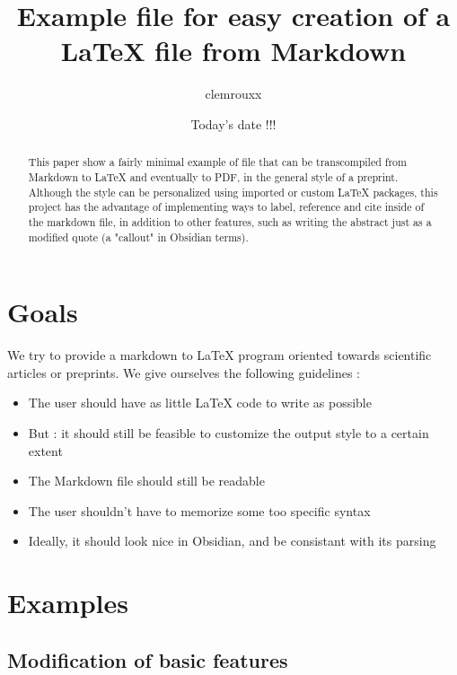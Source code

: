 \documentclass{article}
\title{Example file for easy creation of a LaTeX file from Markdown}
\author[1]{clemrouxx }
\affil[1]{ETH Zürich}
\date{Today's date !!!}
\begin{document}
\maketitle
\begin{abstract}

This paper show a fairly minimal example of file that can be transcompiled from Markdown to LaTeX and eventually to PDF, in the general style of a preprint. Although the style can be personalized using imported or custom LaTeX packages, this project has the advantage of implementing ways to label, reference and cite inside of the markdown file, in addition to other features, such as writing the abstract just as a modified quote (a "callout" in Obsidian terms).
\end{abstract}
\begin{maincontent}

\section{Goals}

We try to provide a markdown to LaTeX program oriented towards scientific articles or preprints. We give ourselves the following guidelines :
\begin{itemize}
\item 
The user should have as little LaTeX code to write as possible

\item 
But : it should still be feasible to customize the output style to a certain extent

\item 
The Markdown file should still be readable

\item 
The user shouldn't have to memorize some too specific syntax

\item 
Ideally, it should look nice in Obsidian, and be consistant with its parsing

\end{itemize}

\section{Examples}

\subsection{Modification of basic features}


\end{maincontent}
\end{document}
